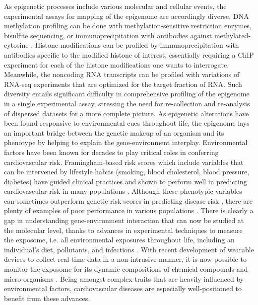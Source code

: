 \documentclass[letter]{bioinfo}
\begin{document}
	
	As epigenetic processes include various molecular and cellular events, the experimental assays for mapping of the epigenome are accordingly diverse. DNA methylation profiling can be done with methylation-sensitive restriction enzymes, bisulfite sequencing, or immunoprecipitation with antibodies against methylated-cytosine \citep{Bibikova:2010:Genomewide}. Histone modifications can be profiled by immunoprecipitation with antibodies specific to the modified histone of interest, essentially requiring a ChIP experiment for each of the histone modifications one wants to interrogate. Meanwhile, the noncoding RNA transcripts can be profiled with variations of RNA-seq experiments that are optimized for the target fraction of RNA. Such diversity entails significant difficulty in comprehensive profiling of the epigenome in a single experimental assay, stressing the need for re-collection and re-analysis of dispersed datasets for a more complete picture. As epigenetic alterations have been found responsive to environmental cues throughout life, the epigenome lays an important bridge between the genetic makeup of an organism and its phenotype by helping to explain the gene-environment interplay.
	Environmental factors have been known for decades to play critical roles in conferring cardiovascular risk. Framingham-based risk scores \citep{Sheridan:2003:Framinghambased} which include variables that can be intervened by lifestyle habits (smoking, blood cholesterol, blood pressure, diabetes) have guided clinical practices \citep{British:1998:Joint} and shown to perform well in predicting cardiovascular risk in many populations \citep{Knuiman:1997:Prediction,Eichler:2007:Prediction}. Although these phenotypic variables can sometimes outperform genetic risk scores in predicting disease risk \citep{Talmud:2010:Utility}, there are plenty of examples of poor performance in various populations \citep{Eichler:2007:Prediction,Zomer:2014:Cardiovascular,DAgostino:2001:Validation,Empana:2003:Are}.
	There is clearly a gap in understanding gene-environment interaction that can now be studied at the molecular level, thanks to advances in experimental techniques to measure the exposome, i.e. all environmental exposures throughout life, including an individual's diet, pollutants, and infections \citep{Wild:2005:Complementing}. With recent development of wearable devices to collect real-time data in a non-intrusive manner, it is now possible to monitor the exposome for its dynamic compositions of chemical compounds and micro-organisms \citep{Warth:2017:ExposomeScale, Jiang:2018:Dynamic}. Being amongst complex traits that are heavily influenced by environmental factors, cardiovascular diseases are especially well-positioned to benefit from these advances.
	
\end{document}
